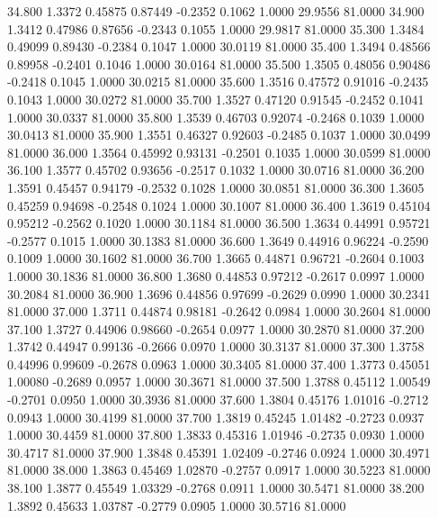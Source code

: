   34.800   1.3372   0.45875   0.87449  -0.2352   0.1062   1.0000  29.9556  81.0000
  34.900   1.3412   0.47986   0.87656  -0.2343   0.1055   1.0000  29.9817  81.0000
  35.300   1.3484   0.49099   0.89430  -0.2384   0.1047   1.0000  30.0119  81.0000
  35.400   1.3494   0.48566   0.89958  -0.2401   0.1046   1.0000  30.0164  81.0000
  35.500   1.3505   0.48056   0.90486  -0.2418   0.1045   1.0000  30.0215  81.0000
  35.600   1.3516   0.47572   0.91016  -0.2435   0.1043   1.0000  30.0272  81.0000
  35.700   1.3527   0.47120   0.91545  -0.2452   0.1041   1.0000  30.0337  81.0000
  35.800   1.3539   0.46703   0.92074  -0.2468   0.1039   1.0000  30.0413  81.0000
  35.900   1.3551   0.46327   0.92603  -0.2485   0.1037   1.0000  30.0499  81.0000
  36.000   1.3564   0.45992   0.93131  -0.2501   0.1035   1.0000  30.0599  81.0000
  36.100   1.3577   0.45702   0.93656  -0.2517   0.1032   1.0000  30.0716  81.0000
  36.200   1.3591   0.45457   0.94179  -0.2532   0.1028   1.0000  30.0851  81.0000
  36.300   1.3605   0.45259   0.94698  -0.2548   0.1024   1.0000  30.1007  81.0000
  36.400   1.3619   0.45104   0.95212  -0.2562   0.1020   1.0000  30.1184  81.0000
  36.500   1.3634   0.44991   0.95721  -0.2577   0.1015   1.0000  30.1383  81.0000
  36.600   1.3649   0.44916   0.96224  -0.2590   0.1009   1.0000  30.1602  81.0000
  36.700   1.3665   0.44871   0.96721  -0.2604   0.1003   1.0000  30.1836  81.0000
  36.800   1.3680   0.44853   0.97212  -0.2617   0.0997   1.0000  30.2084  81.0000
  36.900   1.3696   0.44856   0.97699  -0.2629   0.0990   1.0000  30.2341  81.0000
  37.000   1.3711   0.44874   0.98181  -0.2642   0.0984   1.0000  30.2604  81.0000
  37.100   1.3727   0.44906   0.98660  -0.2654   0.0977   1.0000  30.2870  81.0000
  37.200   1.3742   0.44947   0.99136  -0.2666   0.0970   1.0000  30.3137  81.0000
  37.300   1.3758   0.44996   0.99609  -0.2678   0.0963   1.0000  30.3405  81.0000
  37.400   1.3773   0.45051   1.00080  -0.2689   0.0957   1.0000  30.3671  81.0000
  37.500   1.3788   0.45112   1.00549  -0.2701   0.0950   1.0000  30.3936  81.0000
  37.600   1.3804   0.45176   1.01016  -0.2712   0.0943   1.0000  30.4199  81.0000
  37.700   1.3819   0.45245   1.01482  -0.2723   0.0937   1.0000  30.4459  81.0000
  37.800   1.3833   0.45316   1.01946  -0.2735   0.0930   1.0000  30.4717  81.0000
  37.900   1.3848   0.45391   1.02409  -0.2746   0.0924   1.0000  30.4971  81.0000
  38.000   1.3863   0.45469   1.02870  -0.2757   0.0917   1.0000  30.5223  81.0000
  38.100   1.3877   0.45549   1.03329  -0.2768   0.0911   1.0000  30.5471  81.0000
  38.200   1.3892   0.45633   1.03787  -0.2779   0.0905   1.0000  30.5716  81.0000
